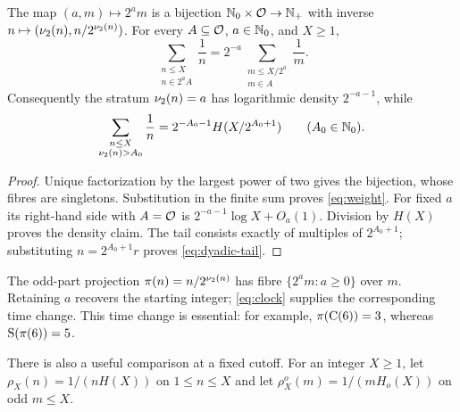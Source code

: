 \begin{proposition}\label{prop:dyadic}
The map $(a,m)\mapsto2^a m$ is a bijection
$\mathbb N_0\times\mathcal O\to\mathbb N_+$ with inverse
$n\mapsto(\nu_2(n),n/2^{\nu_2(n)})$.
For every $A\subseteq\mathcal O$, $a\in\mathbb N_0$, and $X\geq1$,
\begin{equation}\label{eq:weight}
 \sum_{\substack{n\leq X\\n\in2^aA}}\frac1n
 =2^{-a}\sum_{\substack{m\leq X/2^a\\m\in A}}\frac1m.
\end{equation}
Consequently the stratum $\nu_2(n)=a$ has logarithmic density
$2^{-a-1}$, while
\begin{equation}\label{eq:dyadic-tail}
 \sum_{\substack{n\leq X\\\nu_2(n)>A_0}}\frac1n
 =2^{-A_0-1}H(X/2^{A_0+1})\qquad(A_0\in\mathbb N_0).
\end{equation}
\end{proposition}
\begin{proof}
Unique factorization by the largest power of two gives the bijection,
whose fibres are singletons.  Substitution in the finite sum proves
\eqref{eq:weight}.  For fixed $a$ its right-hand side with $A=\mathcal O$ is
$2^{-a-1}\log X+O_a(1)$.  Division by $H(X)$ proves the density claim.
The tail consists exactly of multiples of $2^{A_0+1}$; substituting
$n=2^{A_0+1}r$ proves \eqref{eq:dyadic-tail}.
\end{proof}

The odd-part projection $\pi(n)=n/2^{\nu_2(n)}$ has fibre
$\{2^a m:a\geq0\}$ over $m$.  Retaining $a$ recovers the starting
integer; \eqref{eq:clock} supplies the corresponding time change.
This time change is essential: for example, $\pi(\mathrm C(6))=3$, whereas
$\mathrm S(\pi(6))=5$.

There is also a useful comparison at a fixed cutoff.  For an integer
$X\geq1$, let $\rho_X(n)=1/(nH(X))$ on $1\leq n\leq X$ and let
$\rho_X^o(m)=1/(mH_o(X))$ on odd $m\leq X$.

